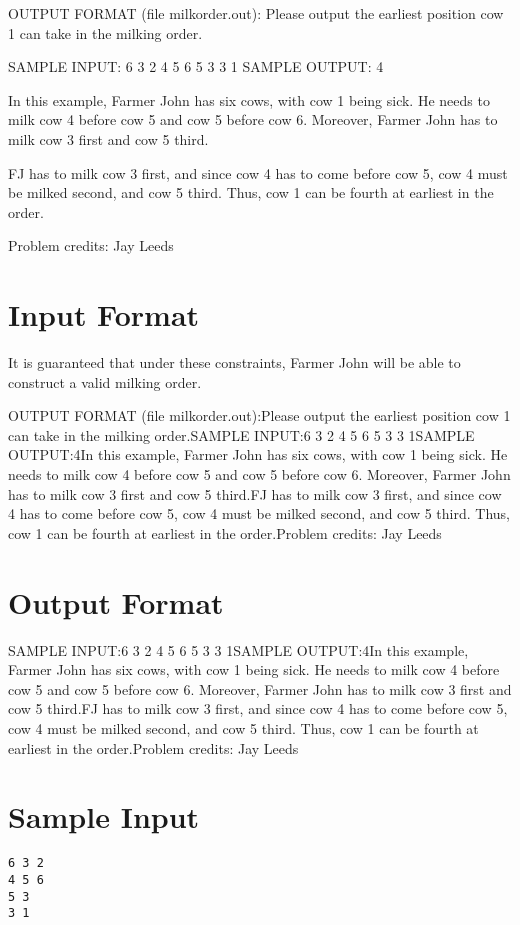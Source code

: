 \documentclass[12pt]{article}
\begin{document}
OUTPUT FORMAT (file milkorder.out):
Please output the earliest position cow 1 can take in the milking order.

SAMPLE INPUT:
6 3 2
4 5 6
5 3
3 1
SAMPLE OUTPUT: 
4

In this example, Farmer John has six cows, with cow 1 being sick.  He needs  to
milk cow 4 before cow 5 and cow 5 before cow 6.  Moreover, Farmer John has to
milk cow 3 first and cow 5 third.  

FJ has to milk cow 3 first, and since cow 4 has to come before cow 5, cow 4 must
be milked second, and cow 5 third.  Thus, cow 1 can be fourth at earliest in the
order.  


Problem credits: Jay Leeds



\section*{Input Format}
It is guaranteed that under these constraints, Farmer John will be able to
construct a valid milking order.

OUTPUT FORMAT (file milkorder.out):Please output the earliest position cow 1 can take in the milking order.SAMPLE INPUT:6 3 2
4 5 6
5 3
3 1SAMPLE OUTPUT:4In this example, Farmer John has six cows, with cow 1 being sick.  He needs  to
milk cow 4 before cow 5 and cow 5 before cow 6.  Moreover, Farmer John has to
milk cow 3 first and cow 5 third.FJ has to milk cow 3 first, and since cow 4 has to come before cow 5, cow 4 must
be milked second, and cow 5 third.  Thus, cow 1 can be fourth at earliest in the
order.Problem credits: Jay Leeds

\section*{Output Format}
SAMPLE INPUT:6 3 2
4 5 6
5 3
3 1SAMPLE OUTPUT:4In this example, Farmer John has six cows, with cow 1 being sick.  He needs  to
milk cow 4 before cow 5 and cow 5 before cow 6.  Moreover, Farmer John has to
milk cow 3 first and cow 5 third.FJ has to milk cow 3 first, and since cow 4 has to come before cow 5, cow 4 must
be milked second, and cow 5 third.  Thus, cow 1 can be fourth at earliest in the
order.Problem credits: Jay Leeds

\section*{Sample Input}
\begin{verbatim}
6 3 2
4 5 6
5 3
3 1
\end{verbatim}
\end{document}
